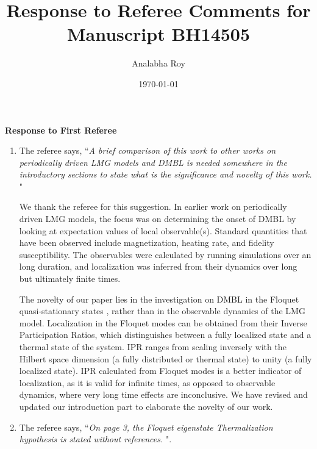 \documentclass[aps,prb,reprint,showpacs,floatfix,superscriptaddress, onecolumn, nofootinbib, 9pt]{revtex4-2}
\newcommand{\response}[1]{{\color{blue}#1}} %
\begin{document}
	
	\title{Response to Referee Comments for Manuscript BH14505}
	\author{Analabha Roy}
	\date{\today}
	
	\maketitle
	
	\vspace{1em}
	
	\noindent \textbf{Response to First Referee}
	
	\begin{enumerate}
		\item The referee says, ``\textit{A brief comparison of this work to other works on periodically driven LMG models and DMBL is needed somewhere in the introductory sections to state what is the significance and novelty of this work. }"\\
		
		\response{
			We thank the referee for this suggestion. In earlier work on periodically driven LMG models,
			the focus was on determining the onset of DMBL by looking at expectation values of local
			observable(s). Standard quantities that have been observed include magnetization, heating rate, and fidelity susceptibility. The observables were calculated by running simulations over an long duration, and localization was inferred from their dynamics over long but ultimately finite times.
			
			The novelty of our paper lies in the investigation on DMBL in the Floquet quasi-stationary states , rather than in the observable dynamics of the LMG model. Localization in the Floquet modes can be obtained from their Inverse Participation Ratios, which distinguishes between a fully localized state and a thermal state of the system. IPR ranges from scaling inversely with the Hilbert space dimension (a fully distributed or thermal state) to unity (a fully localized state). IPR calculated from Floquet modes is a better indicator of localization, as it is valid for infinite times, as opposed to observable dynamics, where very long time effects are inconclusive. We have revised and updated our introduction part to elaborate the novelty of our work.
		


}
		\item The referee says, ``\textit{On page 3, the Floquet eigenstate Thermalization hypothesis is stated without references. }".\\
		

\end{enumerate}
\end{document}
